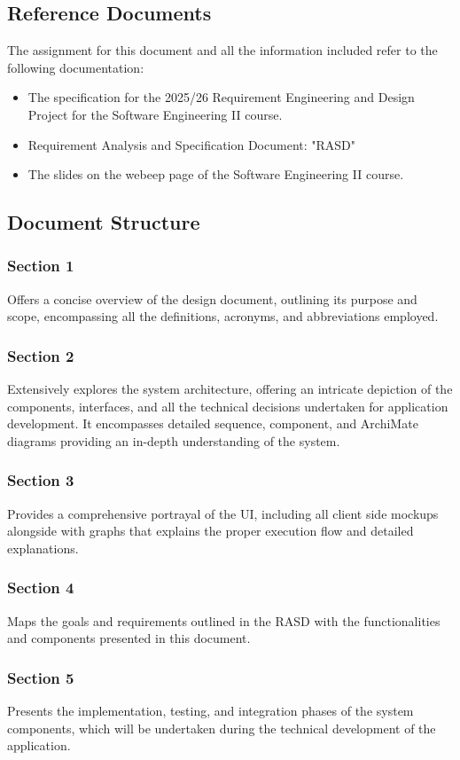 \subsection{Reference Documents}
The assignment for this document and all the information included refer to the following documentation:
\begin{itemize}
    \item The specification for the 2025/26 Requirement Engineering and Design Project for the Software Engineering II course.
    \item Requirement Analysis and Specification Document: "RASD"
    \item The slides on the webeep page of the Software Engineering II course.
\end{itemize}

\subsection{Document Structure}
\subsubsection*{Section 1}
Offers a concise overview of the design document, outlining its purpose and scope, encompassing all the definitions, acronyms, and abbreviations employed.
\subsubsection*{Section 2}
Extensively explores the system architecture, offering an intricate
depiction of the components, interfaces, and all the technical decisions undertaken for application development. It encompasses detailed sequence, component, and ArchiMate diagrams providing an in-depth understanding of the system.
\subsubsection*{Section 3}
Provides a comprehensive portrayal of the UI, including all client
side mockups alongside with graphs that explains the proper execution flow and detailed explanations.
\subsubsection*{Section 4}
Maps the goals and requirements outlined in the RASD with the
functionalities and components presented in this document.
\subsubsection*{Section 5}
Presents the implementation, testing, and integration phases of the
system components, which will be undertaken during the technical development of the application.